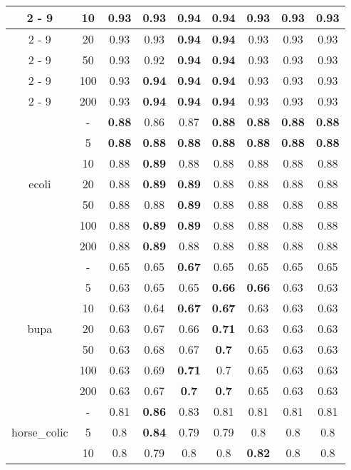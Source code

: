 \documentclass{article}%
\begin{document}
\begin{longtable}{c|c|ccccccc}
\cline{2%
-%
9}%
&10&0.93&0.93&\textbf{0.94}&\textbf{0.94}&0.93&0.93&0.93\\%
\cline{2%
-%
9}%
&20&0.93&0.93&\textbf{0.94}&\textbf{0.94}&0.93&0.93&0.93\\%
\cline{2%
-%
9}%
&50&0.93&0.92&\textbf{0.94}&\textbf{0.94}&0.93&0.93&0.93\\%
\cline{2%
-%
9}%
&100&0.93&\textbf{0.94}&\textbf{0.94}&\textbf{0.94}&0.93&0.93&0.93\\%
\cline{2%
-%
9}%
&200&0.93&\textbf{0.94}&\textbf{0.94}&\textbf{0.94}&0.93&0.93&0.93\\%
\hline%
\multirow{7}{*}{ecoli}&{-}&\textbf{0.88}&0.86&0.87&\textbf{0.88}&\textbf{0.88}&\textbf{0.88}&\textbf{0.88}\\%
\cline{2%
-%
9}%
&5&\textbf{0.88}&\textbf{0.88}&\textbf{0.88}&\textbf{0.88}&\textbf{0.88}&\textbf{0.88}&\textbf{0.88}\\%
\cline{2%
-%
9}%
&10&0.88&\textbf{0.89}&0.88&0.88&0.88&0.88&0.88\\%
\cline{2%
-%
9}%
&20&0.88&\textbf{0.89}&\textbf{0.89}&0.88&0.88&0.88&0.88\\%
\cline{2%
-%
9}%
&50&0.88&0.88&\textbf{0.89}&0.88&0.88&0.88&0.88\\%
\cline{2%
-%
9}%
&100&0.88&\textbf{0.89}&\textbf{0.89}&0.88&0.88&0.88&0.88\\%
\cline{2%
-%
9}%
&200&0.88&\textbf{0.89}&0.88&0.88&0.88&0.88&0.88\\%
\hline%
\multirow{7}{*}{bupa}&{-}&0.65&0.65&\textbf{0.67}&0.65&0.65&0.65&0.65\\%
\cline{2%
-%
9}%
&5&0.63&0.65&0.65&\textbf{0.66}&\textbf{0.66}&0.63&0.63\\%
\cline{2%
-%
9}%
&10&0.63&0.64&\textbf{0.67}&\textbf{0.67}&0.63&0.63&0.63\\%
\cline{2%
-%
9}%
&20&0.63&0.67&0.66&\textbf{0.71}&0.63&0.63&0.63\\%
\cline{2%
-%
9}%
&50&0.63&0.68&0.67&\textbf{0.7}&0.65&0.63&0.63\\%
\cline{2%
-%
9}%
&100&0.63&0.69&\textbf{0.71}&0.7&0.65&0.63&0.63\\%
\cline{2%
-%
9}%
&200&0.63&0.67&\textbf{0.7}&\textbf{0.7}&0.65&0.63&0.63\\%
\hline%
\multirow{7}{*}{horse\_colic}&{-}&0.81&\textbf{0.86}&0.83&0.81&0.81&0.81&0.81\\%
\cline{2%
-%
9}%
&5&0.8&\textbf{0.84}&0.79&0.79&0.8&0.8&0.8\\%
\cline{2%
-%
9}%
&10&0.8&0.79&0.8&0.8&\textbf{0.82}&0.8&0.8\\%

\end{longtable}
\end{document}
